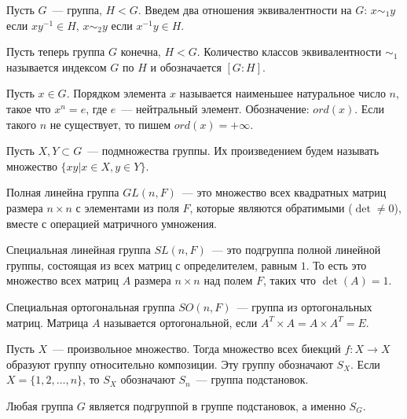 \documentclass{article}
\begin{document}
	\begin{definition}
		Пусть $G$~--- группа, $H < G$. Введем два отношения эквивалентности на $G$: $x \sim_1 y$ если $xy^{-1} \in H$, $x \sim_2 y$ если $x^{-1}y \in H$.
	\end{definition}
	\begin{definition}
		Пусть теперь группа $G$ конечна, $H < G$. Количество классов эквивалентности $\sim_1$ называется индексом $G$ по $H$ и обозначается $[G : H]$.
	\end{definition}
	\begin{definition}
		Пусть $x \in G$. Порядком элемента $x$ называется наименьшее натуральное число $n$, такое что $x^n = e$, где $e$~--- нейтральный элемент. Обозначение: $ord(x)$. Если такого $n$ не существует, то пишем $ord(x) = + \infty$.
	\end{definition}
	\begin{definition}
		Пусть $X, Y \subset G$~--- подмножества группы. Их произведением будем называть множество $\{ xy | x \in X, y \in Y \}$.
	\end{definition}
	\begin{definition}
		Полная линейна группа $GL(n, F)$~--- это множество всех квадратных матриц размера $n \times n$ с элементами из поля $F$, которые являются обратимыми ($\det \not= 0$), вместе с операцией матричного умножения.
	\end{definition}
	\begin{definition}
		Специальная линейная группа $SL(n, F)$~--- это подгруппа полной линейной группы, состоящая из всех матриц с определителем, равным $1$. То есть это множество всех матриц $A$ размера $n \times n$ над полем $F$, таких что $\det(A) = 1$.
	\end{definition}
	\begin{definition}
		Специальная ортогональная группа $SO(n, F)$~--- группа из ортогональных матриц. Матрица $A$ называется ортогональной, если $A^T \times A = A \times A^T = E$.
	\end{definition}
	\begin{statement}
		Пусть $X$~--- произвольное множество. Тогда множество всех биекций $f: X \rightarrow X$ образуют группу относительно композиции. Эту группу обозначают $S_X$. Если $X = \{ 1, 2, \dots, n \}$, то $S_X$ обозначают $S_n$~--- группа подстановок.
	\end{statement}
	\begin{theorem}[Кэли]
		Любая группа $G$ является подгруппой в группе подстановок, а именно $S_G$.
	\end{theorem}
\end{document}
